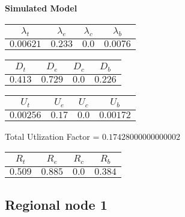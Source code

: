\documentclass{article}
\begin{document}
\begin{minipage}{0.5\textwidth}
\centering	\textbf{Simulated Model}
\begin{table}[H]
\centering
\begin{tabular}{@{}cccc@{}}
\toprule
$\lambda_t$ & $\lambda_e$ & $\lambda_c$ & $\lambda_b$\\
\midrule
$0.00621$ & $0.233$ & $0.0$ & $0.0076$\\
\bottomrule
\end{tabular}
\end{table}
\begin{table}[H]
\centering
\begin{tabular}{@{}cccc@{}}
\toprule
$D_t$ & $D_e$ & $D_c$ & $D_b$\\
\midrule
$0.413$ & $0.729$ & $0.0$ & $0.226$\\
\bottomrule
\end{tabular}
\end{table}\begin{table}[H]
\centering
\begin{tabular}{@{}cccc@{}}
\toprule
$U_t$ & $U_e$ & $U_c$ & $U_b$\\
\midrule
$0.00256$ & $0.17$ & $0.0$ & $0.00172$\\
\bottomrule
\end{tabular}
\end{table}
\centering Total Utlization Factor = $0.17428000000000002$
\begin{table}[H]
\centering
\begin{tabular}{@{}cccc@{}}
\toprule
$R_t$ & $R_e$ & $R_c$ & $R_b$\\
\midrule
$0.509$ & $0.885$ & $0.0$ & $0.384$\\
\bottomrule
\end{tabular}
\end{table}
\end{minipage}\subsection{Regional node 1}
\end{document}
